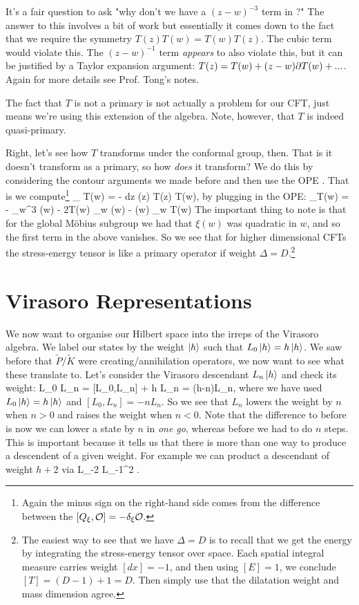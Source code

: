 \badr 
    It's a fair question to ask "why don't we have a $(z-w)^{-3}$ term in ?" The answer to this involves a bit of work but essentially it comes down to the fact that we require the symmetry $T(z)T(w)=T(w)T(z)$. The cubic term would violate this. The $(z-w)^{-1}$ term \textit{appears} to also violate this, but it can be justified by a Taylor expansion argument: $T(z) = T(w) + (z-w)\partial T(w) + ...$. Again for more details see Prof. Tong's notes.
\eadr 

\br 
    The fact that $T$ is not a primary is not actually a problem for our CFT, just means we're using this extension of the algebra. Note, however, that $T$ is indeed quasi-primary. 
\er 

Right, let's see how $T$ transforms under the conformal group, then. That is it doesn't transform as a primary, so how \textit{does} it transform? We do this by considering the contour arguments we made before and then use the OPE . That is we compute\footnote{Again the minus sign on the right-hand side comes from the difference between the $[Q_{\xi},\mathcal{O}] = -\delta_{\xi}\mathcal{O}$.}
\bse 
    \del_{\xi} T(w) = -  \oint dz \xi(z) T(z) T(w),
\ese
by plugging in the OPE:
\bse 
    \del_{\xi}T(w) = - \p_{w}^3 \xi(w) - 2T(w) \p_w \xi(w) - \xi(w) \p_w T(w)
\ese 
The important thing to note is that for the global M\"{o}bius subgroup we had that $\xi(w)$ was quadratic in $w$, and so the first term in the above vanishes. So we see that for higher dimensional CFTs the stress-energy tensor is like a primary operator if weight $\Delta=D$.\footnote{The easiest way to see that we have $\Delta = D$ is to recall that we get the energy by integrating the stress-energy tensor over space. Each spatial integral measure carries weight $[dx]=-1$, and then using $[E]=1$, we conclude $[T]=(D-1)+1=D$. Then simply use that the dilatation weight and mass dimension agree.} 

\section{Virasoro Representations}

We now want to organise our Hilbert space into the irreps of the Virasoro algebra. We label our states by the weight $\ket{h}$ such that $L_0\ket{h} = h\ket{h}$. We saw before that $\widetilde{P}/\widetilde{K}$ were creating/annihilation operators, we now want to see what these translate to. Let's consider the Virasoro descendant $L_n\ket{h}$ and check its weight: 
\bse 
    L_0 L_n  = [L_0,L_n]  + h L_n = (h-n)L_n,
\ese 
where we have used $L_0\ket{h} = h\ket{h}$ and $[L_0,L_n] = -nL_n$. So we see that $L_n$ lowers the weight by $n$ when $n>0$ and raises the weight when $n<0$. Note that the difference to before is now we can lower a state by $n$ in \textit{one go}, whereas before we had to do $n$ steps. This is important because it tells us that there is more than one way to produce a descendent of a given weight. For example we can product a descendant of weight $h+2$ via 
\bse 
    L_{-2} \qquad {} \qquad L_{-1}^2 .
\ese    

